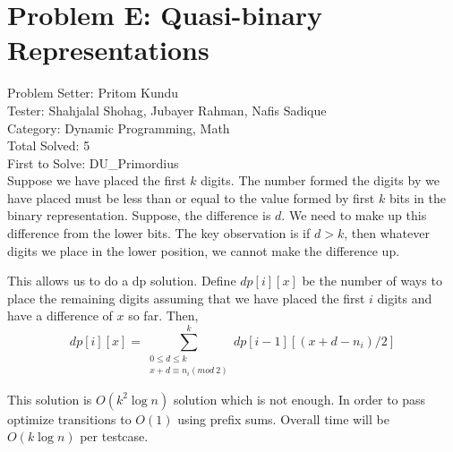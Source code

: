\section*{Problem E: Quasi-binary Representations}
Problem Setter: Pritom Kundu \\
Tester: Shahjalal Shohag, Jubayer Rahman, Nafis Sadique \\
Category: Dynamic Programming, Math \\
Total Solved: 5 \\
First to Solve: DU\_Primordius \\

Suppose we have placed the first $k$ digits. The number formed the digits by we have placed must be less than or equal to the value formed by first $k$ bits in the binary representation. Suppose, the difference is $d$. We need to make up this difference from the lower bits. The key observation is if $d > k$, then whatever digits we place in the lower position, we cannot make the difference up.

This allows us to do a dp solution. Define $dp[i][x]$ be the number of ways to place the remaining digits assuming that we have placed the first $i$ digits and have a difference of $x$ so far. Then, 
$$dp[i][x] = \sum_{\substack{0 \leq d \leq k \\ x+d \equiv n_i (mod\ 2)}}^{k}dp[i-1][(x+d-n_i)/2]$$

This solution is $O(k^2 \log n ) $ solution which is not enough. In order to pass optimize transitions to $O(1)$ using prefix sums. Overall time will be $O(k \log n)$ per testcase.
